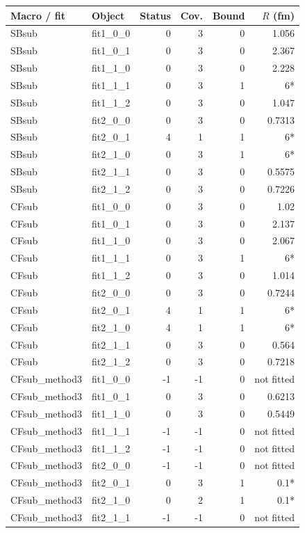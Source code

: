 \documentclass[11pt,a4paper]{article}
\begin{document}
{\scriptsize\begin{longtable}{llrrrr}\hline Macro / fit & Object & Status & Cov. & Bound & $R$ (fm)\\\hline\endhead
SBsub & fit1\_0\_0 & 0 & 3 & 0 & 1.056\\
SBsub & fit1\_0\_1 & 0 & 3 & 0 & 2.367\\
SBsub & fit1\_1\_0 & 0 & 3 & 0 & 2.228\\
SBsub & fit1\_1\_1 & 0 & 3 & 1 & 6*\\
SBsub & fit1\_1\_2 & 0 & 3 & 0 & 1.047\\
SBsub & fit2\_0\_0 & 0 & 3 & 0 & 0.7313\\
SBsub & fit2\_0\_1 & 4 & 1 & 1 & 6*\\
SBsub & fit2\_1\_0 & 0 & 3 & 1 & 6*\\
SBsub & fit2\_1\_1 & 0 & 3 & 0 & 0.5575\\
SBsub & fit2\_1\_2 & 0 & 3 & 0 & 0.7226\\
CFsub & fit1\_0\_0 & 0 & 3 & 0 & 1.02\\
CFsub & fit1\_0\_1 & 0 & 3 & 0 & 2.137\\
CFsub & fit1\_1\_0 & 0 & 3 & 0 & 2.067\\
CFsub & fit1\_1\_1 & 0 & 3 & 1 & 6*\\
CFsub & fit1\_1\_2 & 0 & 3 & 0 & 1.014\\
CFsub & fit2\_0\_0 & 0 & 3 & 0 & 0.7244\\
CFsub & fit2\_0\_1 & 4 & 1 & 1 & 6*\\
CFsub & fit2\_1\_0 & 4 & 1 & 1 & 6*\\
CFsub & fit2\_1\_1 & 0 & 3 & 0 & 0.564\\
CFsub & fit2\_1\_2 & 0 & 3 & 0 & 0.7218\\
CFsub\_method3 & fit1\_0\_0 & -1 & -1 & 0 & not fitted\\
CFsub\_method3 & fit1\_0\_1 & 0 & 3 & 0 & 0.6213\\
CFsub\_method3 & fit1\_1\_0 & 0 & 3 & 0 & 0.5449\\
CFsub\_method3 & fit1\_1\_1 & -1 & -1 & 0 & not fitted\\
CFsub\_method3 & fit1\_1\_2 & -1 & -1 & 0 & not fitted\\
CFsub\_method3 & fit2\_0\_0 & -1 & -1 & 0 & not fitted\\
CFsub\_method3 & fit2\_0\_1 & 0 & 3 & 1 & 0.1*\\
CFsub\_method3 & fit2\_1\_0 & 0 & 2 & 1 & 0.1*\\
CFsub\_method3 & fit2\_1\_1 & -1 & -1 & 0 & not fitted\\

\end{longtable}}
\end{document}
